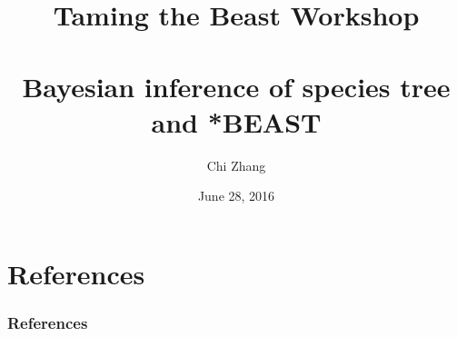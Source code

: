\documentclass[xcolor=pdftex,dvipsnames,table,10pt]{beamer}
\author[]{Chi Zhang}
\title[Taming the Beast]{Taming the Beast Workshop \\ \ \\
       Bayesian inference of species tree \\ and *BEAST}
\date{June 28, 2016}
\begin{document}
\begin{frame}
  \titlepage
\end{frame}



\section{References}
\begin{frame}[t,allowframebreaks]\frametitle{References}

\tiny
\end{frame}
\end{document}
